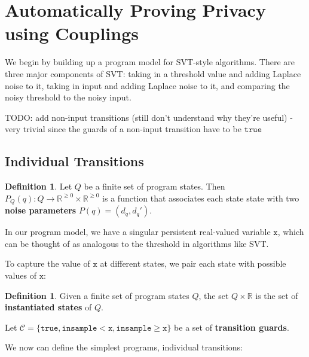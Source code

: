 \documentclass[12pt]{article}
\newcommand{\RR}{\mathbb{R}}
\newcommand{\gguard}[1][x]{\texttt{insample}\geq #1}
\newcommand{\lguard}[1][x]{\texttt{insample} < #1}
\theoremstyle{definition}
\newtheorem{defn}[thm]{Definition}
\begin{document}
\section{Automatically Proving Privacy using Couplings}

We begin by building up a program model for SVT-style algorithms. There are three major components of SVT: taking in a threshold value and adding Laplace noise to it, taking in input and adding Laplace noise to it, and comparing the noisy threshold to the noisy input. 

{\color{red} TODO: add non-input transitions (still don't understand why they're useful) - very trivial since the guards of a non-input transition have to be $\texttt{true}$}

\subsection{Individual Transitions}


\begin{defn}
    Let $Q$ be a finite set of program states. Then $P_Q(q): Q\to \RR^{\geq 0}\times \RR^{\geq 0}$ is a function that associates each state state with two \textbf{noise parameters} $P(q) = (d_q, d_q')$.
\end{defn}

In our program model, we have a singular persistent real-valued variable $\texttt{x}$, which can be thought of as analogous to the threshold in algorithms like SVT. 

To capture the value of $\texttt{x}$ at different states, we pair each state with possible values of $\texttt{x}$:

\begin{defn}
    Given a finite set of program states $Q$, the set $Q\times \RR$ is the set of \textbf{instantiated states} of $Q$. 
\end{defn}

Let $\mathcal{C}=\{\texttt{true}, \lguard[\texttt{x}], \gguard[\texttt{x}]\}$ be a set of \textbf{transition guards}.

We now can define the simplest programs, individual transitions:
\end{document}
